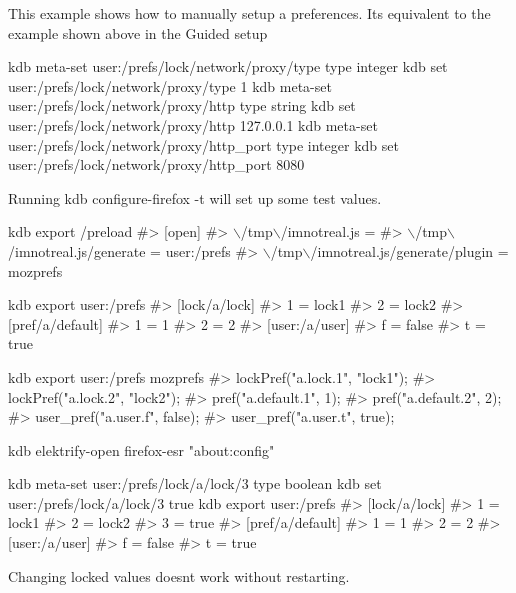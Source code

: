 This example shows how to manually setup a preferences. It\textquotesingle{}s equivalent to the example shown above in the {\ttfamily Guided setup}


\begin{DoxyCode}
kdb meta-set user:/prefs/lock/network/proxy/type type integer
kdb set user:/prefs/lock/network/proxy/type 1
kdb meta-set user:/prefs/lock/network/proxy/http type string
kdb set user:/prefs/lock/network/proxy/http 127.0.0.1
kdb meta-set user:/prefs/lock/network/proxy/http\_port type integer
kdb set user:/prefs/lock/network/proxy/http\_port 8080
\end{DoxyCode}


Running {\ttfamily kdb configure-\/firefox -\/t} will set up some test values.


\begin{DoxyCode}
kdb export /preload
#> [open]
#> \(\backslash\)/tmp\(\backslash\)/imnotreal.js =
#> \(\backslash\)/tmp\(\backslash\)/imnotreal.js/generate = user:/prefs
#> \(\backslash\)/tmp\(\backslash\)/imnotreal.js/generate/plugin = mozprefs

kdb export user:/prefs
#> [lock/a/lock]
#> 1 = lock1
#> 2 = lock2
#> [pref/a/default]
#> 1 = 1
#> 2 = 2
#> [user:/a/user]
#> f = false
#> t = true

kdb export user:/prefs mozprefs
#> lockPref("a.lock.1", "lock1");
#> lockPref("a.lock.2", "lock2");
#> pref("a.default.1", 1);
#> pref("a.default.2", 2);
#> user\_pref("a.user.f", false);
#> user\_pref("a.user.t", true);
\end{DoxyCode}



\begin{DoxyCode}
kdb elektrify-open firefox-esr "about:config"
\end{DoxyCode}





\begin{DoxyCode}
kdb meta-set user:/prefs/lock/a/lock/3 type boolean
kdb set user:/prefs/lock/a/lock/3 true
kdb export user:/prefs
#> [lock/a/lock]
#> 1 = lock1
#> 2 = lock2
#> 3 = true
#> [pref/a/default]
#> 1 = 1
#> 2 = 2
#> [user:/a/user]
#> f = false
#> t = true
\end{DoxyCode}




Changing locked values doesn\textquotesingle{}t work without restarting. 